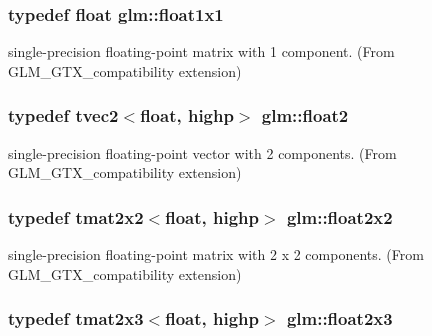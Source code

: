 \subsubsection[{float1x1}]{\setlength{\rightskip}{0pt plus 5cm}typedef float {\bf glm\+::float1x1}}\label{group__gtx__compatibility_gaac1faa940ac1fbb32d4a315005b578af}


single-\/precision floating-\/point matrix with 1 component. (From G\+L\+M\+\_\+\+G\+T\+X\+\_\+compatibility extension) 

\hypertarget{group__gtx__compatibility_ga3174e387d3b89c5dcff485c4e665a68c}{}
\subsubsection[{float2}]{\setlength{\rightskip}{0pt plus 5cm}typedef tvec2$<$float, highp$>$ {\bf glm\+::float2}}\label{group__gtx__compatibility_ga3174e387d3b89c5dcff485c4e665a68c}


single-\/precision floating-\/point vector with 2 components. (From G\+L\+M\+\_\+\+G\+T\+X\+\_\+compatibility extension) 

\hypertarget{group__gtx__compatibility_ga577dc885086d068647175794909bc026}{}
\subsubsection[{float2x2}]{\setlength{\rightskip}{0pt plus 5cm}typedef tmat2x2$<$float, highp$>$ {\bf glm\+::float2x2}}\label{group__gtx__compatibility_ga577dc885086d068647175794909bc026}


single-\/precision floating-\/point matrix with 2 x 2 components. (From G\+L\+M\+\_\+\+G\+T\+X\+\_\+compatibility extension) 

\hypertarget{group__gtx__compatibility_gad4078adf5ec44d1878c63bf2962fbe9e}{}
\subsubsection[{float2x3}]{\setlength{\rightskip}{0pt plus 5cm}typedef tmat2x3$<$float, highp$>$ {\bf glm\+::float2x3}}\label{group__gtx__compatibility_gad4078adf5ec44d1878c63bf2962fbe9e}


